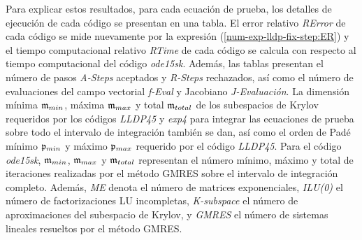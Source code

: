 Para explicar estos resultados, para cada ecuación de prueba, los detalles de ejecución de cada código se presentan en una tabla. El error relativo \textit{RError} de cada código se mide nuevamente por la expresión (\ref{num-exp-lldp-fix-step:ER}) y el tiempo computacional relativo \textit{RTime} de cada código se calcula con respecto al tiempo computacional del código \emph{ode15sk}. Además, las tablas presentan el número de pasos \textit{A-Steps} aceptados y \textit{R-Steps} rechazados, así como el número de evaluaciones del campo vectorial \textit{f-Eval} y Jacobiano \textit{J-Evaluación}. La dimensión mínima $\mathfrak{m}_ {min}$, máxima $\mathfrak{m}_ {max}$ y total $\mathfrak{m}_{total}$ de los subespacios de Krylov requeridos por los códigos \emph{LLDP45} y \emph{exp4} para integrar las ecuaciones de prueba sobre todo el intervalo de integración  también se dan, así como el orden de Padé mínimo $\mathfrak{p}_{min}$ y máximo $\mathfrak{p}_{max}$ requerido por el código \emph{LLDP45}. Para el código \emph{ode15sk}, $\mathfrak{m}_{min}$, $\mathfrak{m}_{max}$ y $\mathfrak{m}_{total}$ representan el número mínimo, máximo y total de iteraciones realizadas por el método GMRES sobre el intervalo de integración completo. Además, \textit{ME} denota el número de matrices exponenciales, \textit{ILU(0)} el número de factorizaciones LU incompletas, \textit{K-subspace} el número de aproximaciones del subespacio de Krylov, y \textit{GMRES} el número de sistemas lineales resueltos por el método GMRES.


